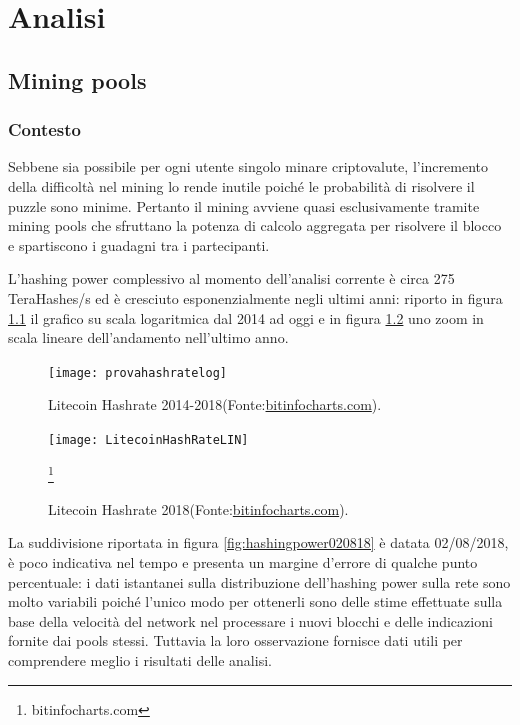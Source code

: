 
\chapter{Analisi}\label{sec:analisi}


\section{Mining pools}

\subsection{Contesto}
Sebbene sia possibile per ogni utente singolo minare criptovalute, l’incremento della difficoltà nel mining lo rende inutile poiché le probabilità di risolvere il puzzle sono minime. Pertanto il mining avviene quasi esclusivamente tramite mining pools che sfruttano la potenza di calcolo aggregata per risolvere il blocco e spartiscono i guadagni tra i partecipanti.


L’hashing power complessivo al momento dell’analisi corrente è circa 275 TeraHashes/s ed è cresciuto esponenzialmente negli ultimi anni: riporto in figura \ref{fig:provahashratelog} il grafico su scala logaritmica dal 2014 ad oggi e in figura \ref{fig:litecoinhashratelin} uno zoom in scala lineare dell’andamento nell’ultimo anno.


\begin{figure}[h]
	\texttt{[image: provahashratelog]}
	\caption{Litecoin Hashrate 2014-2018(Fonte:\url{bitinfocharts.com}).}
	\label{fig:provahashratelog}
\end{figure}

\begin{figure}
	\centering
	\texttt{[image: LitecoinHashRateLIN]}
	\caption{Litecoin Hashrate 2018(Fonte:\url{bitinfocharts.com}).} 
	\label{fig:litecoinhashratelin}
	\footnote{bitinfocharts.com}
\end{figure}


La suddivisione riportata in figura \ref{fig:hashingpower020818} è datata 02/08/2018, è poco indicativa nel tempo e presenta un margine d’errore di qualche punto percentuale: i dati istantanei sulla distribuzione dell’hashing power sulla rete sono molto variabili poiché l’unico modo per ottenerli sono delle stime effettuate sulla base della velocità del network nel processare i nuovi blocchi e delle indicazioni fornite dai pools stessi. Tuttavia la loro osservazione fornisce dati utili per comprendere meglio i risultati delle analisi.


